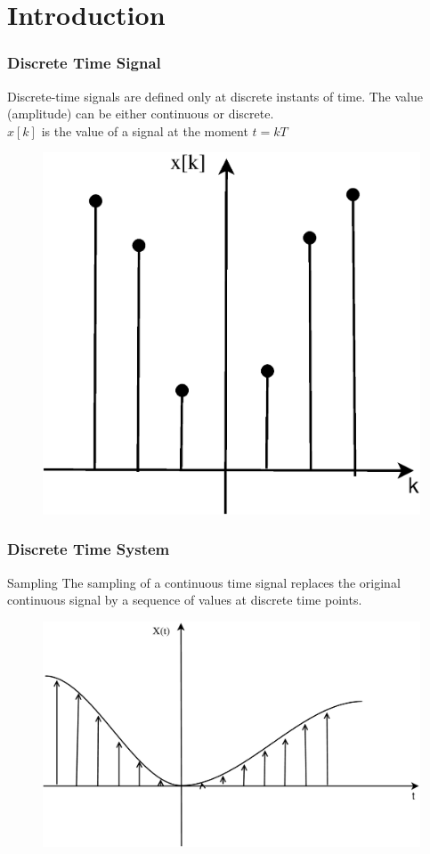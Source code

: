 \section{Introduction}

\def\Z{$\mathbb{Z}$}
\def\R{$\mathbb{R}$}
\newcommand\Wider[2][3em]{%
	\makebox[\linewidth][c]{%
		\begin{minipage}{\dimexpr\textwidth+#1\relax}
			\raggedright#2
		\end{minipage}%
	}%
}
\begin{frame}
	\frametitle{Discrete Time Signal}
	\begin{definition}
		Discrete-time signals are defined only at discrete instants of time. The value (amplitude) can be either continuous or discrete.\\
		$x[k]$ is the value of a signal at the moment $t = kT$
	\end{definition}
	\begin{example}
		\begin{figure}
		\centering
		\includegraphics[width=0.25\linewidth]{Images/Discrete_time_eps_1.eps}
\end{figure}

	\end{example}
\end{frame}
\begin{frame}
	\frametitle{Discrete Time System}
	\begin{block}{Sampling}
		The sampling of a continuous time signal replaces the original continuous signal by a sequence of values at discrete time points.
		\begin{figure}
			\centering
			\includegraphics[width=0.5\linewidth]{Images/Discrete_time_eps_4}
		\end{figure}

	\end{block}
\end{frame}
